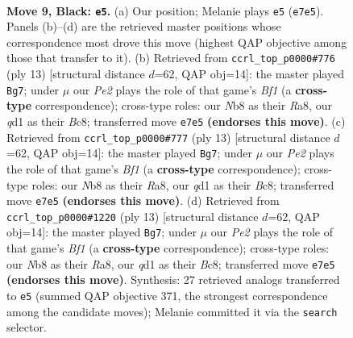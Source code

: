 \documentclass[11pt]{article}
\begin{document}
\clearpage

\begin{figure}[p]\centering
\begin{subfigure}{0.46\textwidth}\centering
\resizebox{\linewidth}{!}{%
\newchessgame
\chessboard[
  setfen={rn1qkbnr/3pp2p/b4pp1/2pP4/5PPP/2N5/PP2P3/R1BQKBNR b KQkq - 0 9},
  showmover=false,
  pgfstyle=straightmove, color=movearrow, markmove={e7-e5}
]}
\caption{}
\end{subfigure}\hfill
\begin{subfigure}{0.46\textwidth}\centering
\resizebox{\linewidth}{!}{%
\newchessgame
\chessboard[
  setfen={rnbqkb1r/pp3p1p/3p1np1/2pP4/8/2N3P1/PP2PPBP/R1BQK1NR b KQkq - 1 7},
  showmover=false,
  pgfstyle=straightmove, color=movearrow, markmove={f8-g7}
]}
\caption{}
\end{subfigure}
\\[4pt]
\begin{subfigure}{0.46\textwidth}\centering
\resizebox{\linewidth}{!}{%
\newchessgame
\chessboard[
  setfen={rnbqkb1r/pp3p1p/3p1np1/2pP4/8/2N3P1/PP2PPBP/R1BQK1NR b KQkq - 1 7},
  showmover=false,
  pgfstyle=straightmove, color=movearrow, markmove={f8-g7}
]}
\caption{}
\end{subfigure}\hfill
\begin{subfigure}{0.46\textwidth}\centering
\resizebox{\linewidth}{!}{%
\newchessgame
\chessboard[
  setfen={rnbqkb1r/pp3p1p/3p1np1/2pP4/8/2N3P1/PP2PPBP/R1BQK1NR b KQkq - 1 7},
  showmover=false,
  pgfstyle=straightmove, color=movearrow, markmove={f8-g7}
]}
\caption{}
\end{subfigure}
\caption{\textbf{Move 9, Black: \texttt{e5}.} (a) Our position; Melanie plays \texttt{e5} (\texttt{e7e5}). Panels (b)--(d) are the retrieved master positions whose correspondence most drove this move (highest QAP objective among those that transfer to it). (b) Retrieved from \texttt{ccrl\_top\_p0000\#776} (ply 13) [structural distance $d$=62, QAP obj=14]: the master played \texttt{Bg7}; under $\mu$ our \emph{Pe2} plays the role of that game's \emph{Bf1} (a \textbf{cross-type} correspondence); cross-type roles: our \emph{N}b8 as their \emph{R}a8, our \emph{q}d1 as their \emph{B}c8; transferred move \texttt{e7e5} \textbf{(endorses this move)}. (c) Retrieved from \texttt{ccrl\_top\_p0000\#777} (ply 13) [structural distance $d$=62, QAP obj=14]: the master played \texttt{Bg7}; under $\mu$ our \emph{Pe2} plays the role of that game's \emph{Bf1} (a \textbf{cross-type} correspondence); cross-type roles: our \emph{N}b8 as their \emph{R}a8, our \emph{q}d1 as their \emph{B}c8; transferred move \texttt{e7e5} \textbf{(endorses this move)}. (d) Retrieved from \texttt{ccrl\_top\_p0000\#1220} (ply 13) [structural distance $d$=62, QAP obj=14]: the master played \texttt{Bg7}; under $\mu$ our \emph{Pe2} plays the role of that game's \emph{Bf1} (a \textbf{cross-type} correspondence); cross-type roles: our \emph{N}b8 as their \emph{R}a8, our \emph{q}d1 as their \emph{B}c8; transferred move \texttt{e7e5} \textbf{(endorses this move)}. Synthesis: 27 retrieved analogs transferred to \texttt{e5} (summed QAP objective 371, the strongest correspondence among the candidate moves); Melanie committed it via the \texttt{search} selector.}
\label{fig:thought-m17}
\end{figure}
\end{document}

